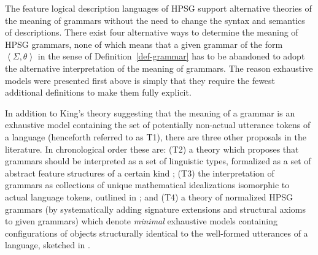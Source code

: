 \documentclass[output=paper
                ,modfonts
                ,nonflat
	        ,collection
	        ,collectionchapter
	        ,collectiontoclongg
 	        ,biblatex
                ,babelshorthands
                ,newtxmath
                ,draftmode
                ,colorlinks, citecolor=brown
]{./langsci/langscibook}
\begin{document}
{{The feature logical description languages of HPSG support alternative
theories of the meaning of grammars without the need to change the
syntax and semantics of descriptions. There exist four
alternative ways to determine the meaning of HPSG grammars, none of
which means that a given grammar of the form $\left< \Sigma, \theta
\right>$ in the sense of Definition~\ref{def-grammar} has to be
abandoned to adopt the alternative interpretation of the meaning of
grammars. The reason exhaustive models were presented first above is
simply that they require the fewest additional definitions to make them
fully explicit.

In addition to King's theory suggesting that the meaning of a grammar
is an exhaustive model containing the set of potentially non-actual
utterance tokens of a language (henceforth referred to as T1), there
are three other proposals in the literature. In chronological order
these are: (T2) a theory which proposes that grammars should be
interpreted as a set of linguistic types, formalized as a set of
abstract feature structures of a certain kind \citep{PollardSag1994};
(T3) the interpretation of grammars as collections of unique
mathematical idealizations isomorphic to actual language tokens,
outlined in \cite{Pollard99a}; and (T4) a theory of normalized HPSG
grammars (by systematically adding signature extensions and structural
axioms to given grammars) which denote \emph{minimal} exhaustive
models containing configurations of objects structurally identical to
the well-formed utterances of a language, sketched in
\cite{Richter2007a}.

}}
\end{document}
